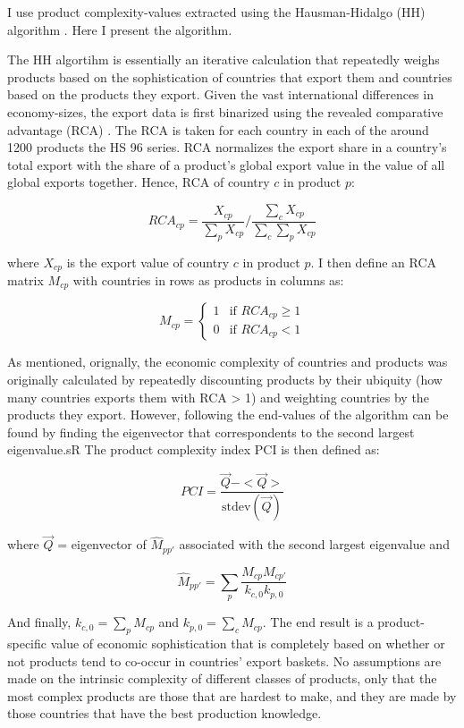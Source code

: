 \documentclass[11pt]{article}
\begin{document}
\begin{appendices}
I use product complexity-values extracted using the Hausman-Hidalgo (HH) algorithm \citep{hidalgo_building_2009}. Here I present the algorithm. 

The HH algortihm is essentially an iterative calculation that repeatedly weighs products based on the sophistication of countries that export them and countries based on the products they export. Given the vast international differences in economy-sizes, the export data is first binarized using the revealed comparative advantage (RCA) \citep{balassa_trade_1965}. The RCA is taken for each country in each of the around 1200 products the HS 96 series. RCA normalizes the export share in a country's total export with the share of a product's global export value in the value of all global exports together. Hence, RCA of country \(c\) in product \(p\):

\[
RCA_{cp} = \frac{X_{cp}}{\sum_p X_{cp}} \bigg/ \frac{\sum_c X_{cp}}{\sum_c \sum_p X_{cp}}
\]

where \(X_{cp}\) is the export value of country \(c\) in product \(p\). I then define an RCA matrix \(M_{cp}\) with countries in rows as products in columns as:

\[
M_{cp} = \begin{cases}
1 & \text{if } RCA_{cp} \geq 1 \\
0 & \text{if } RCA_{cp} < 1
\end{cases}
\]

As mentioned, orignally, the economic complexity of countries and products was originally calculated by repeatedly discounting products by their ubiquity (how many countries exports them with RCA > 1) and weighting countries by the products they export. However, following \cite{hausmann_atlas_2013} the end-values of the algorithm can be found by finding the eigenvector that correspondents to the second largest eigenvalue.sR The product complexity index PCI is then defined as:

\[
  PCI = \frac{\vec{Q} - < \vec{Q} >}{\text{stdev}(\vec{Q})}
\]

 where \(\vec{Q}\) = eigenvector of \(\hat{M}_{pp'}\) associated with the second largest eigenvalue and

\[
\hat{M}_{pp'} = \sum_p \frac{M_{cp}M_{cp'}}{k_{c,0}k_{p,0}}
\]

And finally, \(k_{c,0} = \sum_p M_{cp}\) and \(k_{p,0} = \sum_c M_{cp}\). The end result is a product-specific value of economic sophistication that is completely based on whether or not products tend to co-occur in countries' export baskets. No assumptions are made on the intrinsic complexity of different classes of products, only that the most complex products are those that are hardest to make, and they are made by those countries that have the best production knowledge.


\end{appendices}
\end{document}
